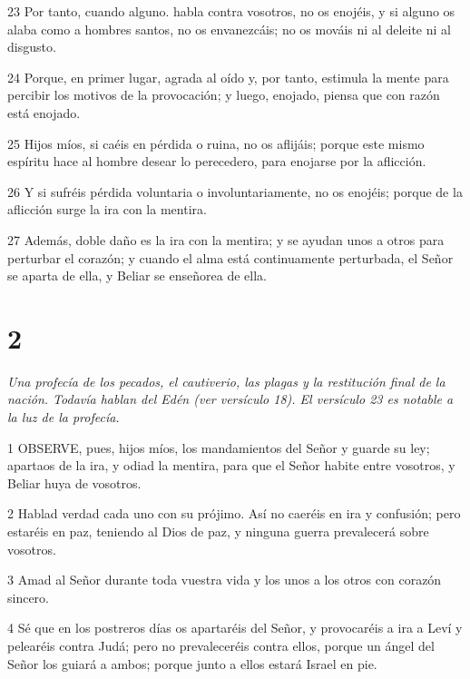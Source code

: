 \par 23 Por tanto, cuando alguno. habla contra vosotros, no os enojéis, y si alguno os alaba como a hombres santos, no os envanezcáis; no os mováis ni al deleite ni al disgusto.

\par 24 Porque, en primer lugar, agrada al oído y, por tanto, estimula la mente para percibir los motivos de la provocación; y luego, enojado, piensa que con razón está enojado.

\par 25 Hijos míos, si caéis en pérdida o ruina, no os aflijáis; porque este mismo espíritu hace al hombre desear lo perecedero, para enojarse por la aflicción.

\par 26 Y si sufréis pérdida voluntaria o involuntariamente, no os enojéis; porque de la aflicción surge la ira con la mentira.

\par 27 Además, doble daño es la ira con la mentira; y se ayudan unos a otros para perturbar el corazón; y cuando el alma está continuamente perturbada, el Señor se aparta de ella, y Beliar se enseñorea de ella.



\chapter{2}

\par \textit{Una profecía de los pecados, el cautiverio, las plagas y la restitución final de la nación. Todavía hablan del Edén (ver versículo 18). El versículo 23 es notable a la luz de la profecía.}

\par 1 OBSERVE, pues, hijos míos, los mandamientos del Señor y guarde su ley; apartaos de la ira, y odiad la mentira, para que el Señor habite entre vosotros, y Beliar huya de vosotros.

\par 2 Hablad verdad cada uno con su prójimo. Así no caeréis en ira y confusión; pero estaréis en paz, teniendo al Dios de paz, y ninguna guerra prevalecerá sobre vosotros.

\par 3 Amad al Señor durante toda vuestra vida y los unos a los otros con corazón sincero.

\par 4 Sé que en los postreros días os apartaréis del Señor, y provocaréis a ira a Leví y pelearéis contra Judá; pero no prevaleceréis contra ellos, porque un ángel del Señor los guiará a ambos; porque junto a ellos estará Israel en pie.

